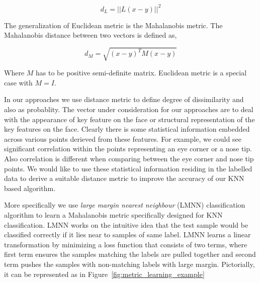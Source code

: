 \begin{equation}
    d_L = || L(x - y) ||^2
\end{equation}

The generalization of Euclidean metric is the Mahalanobis metric. The Mahalanobis distance between two
vectors is defined as,

\begin{equation}
    d_M = \sqrt{ (x-y)^T M (x-y) }
\end{equation}

Where $M$ has to be positive semi-definite matrix. Euclidean metric is a special case with $M = I$.

In our approaches we use distance metric to define degree of dissimilarity and also as probablity. 
The vector under consideration for our approaches are to deal with the appearance of key feature on
the face or structural representation of the key features on the face. Clearly there is some
statistical information embedded across various points derieved from these features. For example,
we could see significant correlation within the points representing an eye corner or a nose tip.
Also correlation is different when comparing between the eye corner and nose tip points. We
would like to use these statistical information residing in the labelled data to derive a 
suitable distance metric to improve the accuracy of our KNN based algorithm.

More specifically we use \textit{large margin nearest neighbour} (LMNN) classification algorithm
to learn a Mahalanobis metric specifically designed for KNN classification. LMNN works on the 
intuitive idea that the test sample would be classified correctly if it lies near to samples of
same label. LMNN learns a linear transformation by minimizing a loss function that consists of 
two terms, where first term ensures the samples matching the labels are pulled together and 
second term pushes the samples with non-matching labels with large margin. Pictorially, it can
be represented as in Figure~\ref{fig:metric_learning_example}

% 
